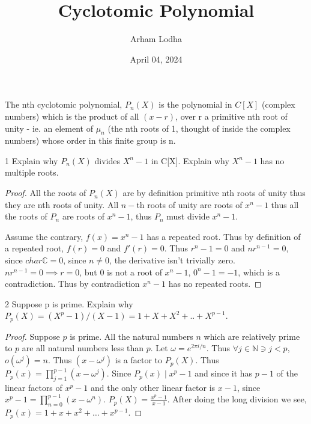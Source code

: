 \documentclass{article}
\newcommand{\C}{\mathbb{C}}
\newcommand{\N}{\mathbb{N}}
\begin{document}
\title{Cyclotomic Polynomial}
\author{Arham Lodha}%
\date{April 04, 2024}%
\maketitle

The nth cyclotomic polynomial, $P_n(X)$ is the polynomial in  $C[X]$ (complex numbers) which is 
the product of all $(x - r)$, over r a primitive nth root of unity - ie. an element of $\mu_n$  (the nth roots of 1, thought of inside the complex numbers) whose order in this finite group is n. 

\begin{PROB}{1}\label{Problem 1.}
    Explain why $P_n(X)$ divides $X^n -1$ in C[X]. Explain why $X^n -1$ has no multiple roots.
\end{PROB}
\begin{proof}
    All the roots of $P_n(X)$ are by definition primitive nth roots of unity thus they are nth roots of unity. All $n-$th roots of unity are roots of $x^n - 1$ thus all the roots of $P_n$ are roots of $x^n - 1$, thus $P_n$ must divide $x^n - 1$.
    
    Assume the contrary, $f(x) = x^n - 1$ has a repeated root. Thus by definition of a repeated root, $f(r) = 0$ and $f'(r) = 0$. Thus $r^n - 1 = 0$ and $nr^{n - 1} = 0$, since $char \C = 0$, since $n \neq 0$, the derivative isn't trivially zero. $nr^{n - 1} = 0 \implies r = 0$, but 0 is not a root of $x^n - 1$, $0^n - 1 = -1$, which is a contradiction. Thus by contradiction $x^n - 1$ has no repeated roots.        
\end{proof}

\bigskip

\begin{PROB}{2}\label{Problem 2.}
    Suppose p is prime. Explain why $P_p(X) = (X^p - 1)/(X - 1) = 1 + X + X^2 + .. + X^{p-1}$.
\end{PROB}
\begin{proof}
    Suppose $p$ is prime. All the natural numbers $n$  which are relatively prime to $p$ are all natural numbers less than $p$. Let $\omega = e^{2 \pi i / n}$. Thus $\forall j \in \N \ni j < p$, $o(\omega^j) = n$. Thus $(x - \omega^j)$ is a factor to $P_p(X)$. Thus $P_p(x) = \prod_{j = 1}^{p  - 1}(x - \omega^j)$. Since $P_p(x) \mid x^p - 1$ and since it has $p - 1$ of the linear factors of $x^p - 1$ and the only other linear factor is $x - 1$, since $x^p - 1 = \prod_{n = 0}^{p - 1}(x- \omega^n)$. $P_p(X) = \frac{x^p - 1}{x - 1}$. After doing the long division we see, $P_p(x) = 1 + x+x^2 +\dots + x^{p - 1}$.               
\end{proof}
\end{document}
